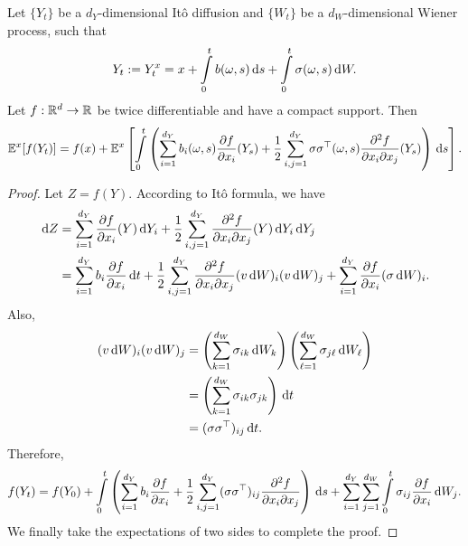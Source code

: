 \begin{lemma}
  \label{lemma:generator}
  Let $\{Y_t\}$ be a $d_Y$-dimensional Itô diffusion and $\{W_t\}$ be a $d_W$-dimensional Wiener process, such that
  $$Y_t := Y^{x}_t = x + \int\limits_0^t b(\omega, s) \,\mathrm{d} s + \int\limits_0^t \sigma(\omega, s) \,\mathrm{d} W.$$
  Let $f:\mathbb{R}^d\to \mathbb{R}$ be twice differentiable and have a compact support. Then
  \begin{equation}
    \mathbb{E}^x[f(Y_t)] = f(x) + \mathbb{E}^x\left[\int\limits_0^t\left(\sum\limits_{i=1}^{d_Y} b_i(\omega,s)\dfrac{\partial f}{\partial x_i}(Y_s) + \dfrac{1}{2}\sum\limits_{i,j=1}^{d_Y} \sigma\sigma^\top (\omega, s)\dfrac{\partial^2f}{\partial x_i \partial x_j}(Y_s)\right)\,\mathrm{d} s \right].
  \end{equation}
\end{lemma}
\begin{proof}
  Let $Z = f(Y)$. According to Itô formula, we have
  \begin{align*}
    \,\mathrm{d} Z
     & = \sum\limits_{i=1}^{d_Y}\dfrac{\partial f}{\partial x_i}(Y)\,\mathrm{d} Y_i + \dfrac{1}{2}\sum\limits_{i,j=1}^{d_Y} \dfrac{\partial^2f}{\partial x_i \partial x_j}(Y)\,\mathrm{d} Y_i \,\mathrm{d} Y_j                                                                               \\
     & = \sum\limits_{i=1}^{d_Y} b_i \dfrac{\partial f}{\partial x_i}\,\mathrm{d} t + \dfrac{1}{2}\sum\limits_{i,j=1}^{d_Y} \dfrac{\partial^2f}{\partial x_i \partial x_j}(v\,\mathrm{d} W)_i (v\,\mathrm{d} W)_j +  \sum\limits_{i=1}^{d_Y}\dfrac{\partial f}{\partial x_i}(\sigma \,\mathrm{d} W)_i.
  \end{align*}
  Also,
  \begin{align*}
    (v\,\mathrm{d} W)_i (v\,\mathrm{d} W)_j
     & = \left(\sum\limits_{k=1}^{d_W}\sigma_{ik}\,\mathrm{d} W_k\right)\left(\sum\limits_{\ell=1}^{d_W}\sigma_{j\ell}\,\mathrm{d} W_\ell\right) \\
     & = \left(\sum\limits_{k=1}^{d_W}\sigma_{ik}\sigma_{jk}\right)\,\mathrm{d} t                                                      \\
     & = (\sigma\sigma^\top)_{ij}\,\mathrm{d} t.
  \end{align*}
  Therefore,
  \begin{align*}
    f(Y_t)
    = f(Y_0) + \int\limits_0^t\left(\sum\limits_{i=1}^{d_Y}b_i\dfrac{\partial f}{\partial x_i} + \dfrac{1}{2}\sum\limits_{i,j=1}^{d_Y} (\sigma\sigma^\top)_{ij} \dfrac{\partial^2f}{\partial x_i \partial x_j}\right) \,\mathrm{d} s +  \sum\limits_{i=1}^{d_Y}\sum\limits_{j=1}^{d_W}\int\limits_0^t\sigma_{ij}\dfrac{\partial f}{\partial x_i} \,\mathrm{d} W_j.
  \end{align*}
  We finally take the expectations of two sides to complete the proof.
\end{proof}

